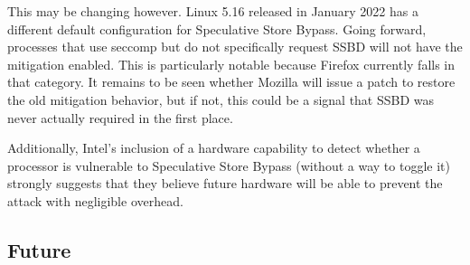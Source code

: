 This may be changing however.
Linux 5.16 released in January 2022 has a different default configuration for Speculative Store Bypass.
Going forward, processes that use seccomp but do not specifically request SSBD will not have the mitigation enabled.
This is particularly notable because Firefox currently falls in that category.
It remains to be seen whether Mozilla will issue a patch to restore the old mitigation behavior, but if not, this could be a signal that SSBD was never actually required in the first place.

Additionally, Intel's inclusion of a hardware capability to detect whether a
processor is vulnerable to Speculative Store Bypass (without a way to toggle it) strongly
suggests that they believe future hardware will be able to prevent
the attack with negligible overhead.

\subsection{Future}







